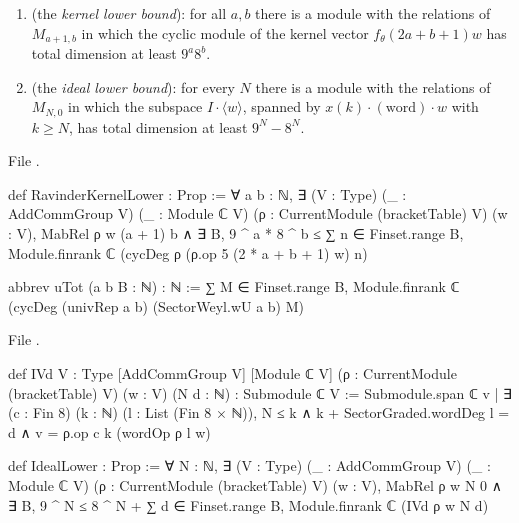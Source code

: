 \begin{definition}\label{l26:def:s2}
\leavevmode
\begin{enumerate}
\item[(a)] \textbf{} (the \emph{kernel lower bound}): for all $a,b$ there is a module with the
relations of $M_{a+1,b}$ in which the cyclic module of the kernel vector $f_\theta(2a+b+1)w$ has total dimension at least
$9^a8^b$.
\item[(b)] \textbf{} (the \emph{ideal lower bound}): for every $N$ there is a module with the relations of
$M_{N,0}$ in which the subspace $I\cdot\langle w\rangle$, spanned by $x(k)\cdot(\text{word})\cdot w$ with $k\ge N$, has total
dimension at least $9^N-8^N$.
\end{enumerate}
\end{definition}
\noindent File .
\begin{leancode}
def RavinderKernelLower : Prop :=
  ∀ a b : ℕ, ∃ (V : Type) (_ : AddCommGroup V) (_ : Module ℂ V) (ρ : CurrentModule (bracketTable) V)
    (w : V), MabRel ρ w (a + 1) b ∧
    ∃ B, 9 ^ a * 8 ^ b ≤ ∑ n ∈ Finset.range B,
      Module.finrank ℂ (cycDeg ρ (ρ.op 5 (2 * a + b + 1) w) n)

abbrev uTot (a b B : ℕ) : ℕ :=
  ∑ M ∈ Finset.range B, Module.finrank ℂ (cycDeg (univRep a b) (SectorWeyl.wU a b) M)
\end{leancode}
\noindent File .
\begin{leancode}
def IVd {V : Type} [AddCommGroup V] [Module ℂ V] (ρ : CurrentModule (bracketTable) V) (w : V) (N d : ℕ) :
    Submodule ℂ V :=
  Submodule.span ℂ {v | ∃ (c : Fin 8) (k : ℕ) (l : List (Fin 8 × ℕ)), N ≤ k ∧
    k + SectorGraded.wordDeg l = d ∧ v = ρ.op c k (wordOp ρ l w)}

def IdealLower : Prop :=
  ∀ N : ℕ, ∃ (V : Type) (_ : AddCommGroup V) (_ : Module ℂ V) (ρ : CurrentModule (bracketTable) V)
    (w : V), MabRel ρ w N 0 ∧ ∃ B, 9 ^ N ≤ 8 ^ N + ∑ d ∈ Finset.range B, Module.finrank ℂ (IVd ρ w N d)
\end{leancode}

